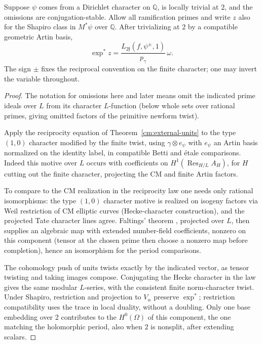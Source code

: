 \begin{lemma}\label{cm:period-transfer}
Suppose \(\psi\) comes from a Dirichlet character on \(\mathbb Q\),
is locally trivial at \(2\), and the omissions are conjugation-stable.
Allow all ramification primes and write \(z\) also for the Shapiro
class in \(M^*\psi\) over \(\mathbb Q\).
After trivializing at \(2\) by a compatible geometric Artin basis,
\[
 \exp^*z=\frac{L_{2\mathfrak f}(f,\psi^\pm,1)}{p_\gamma}\,\omega .
 \tag{C3}\label{eq:C3}
\]
The sign \(\pm\) fixes the reciprocal convention on the finite
character; one may invert the variable throughout.
\end{lemma}

\begin{proof}
The notation for omissions here and later means omit the indicated prime ideals over \(L\)
from its character \(L\)-function (below whole sets over rational primes, giving omitted
factors of the primitive newform twist).

Apply the reciprocity equation of Theorem~\ref{cm:external-units} to the type \((1,0)\)
character modified by the finite twist, using \(\gamma\otimes e_\psi\) with \(e_\psi\) an
Artin basis normalized on the identity label, in compatible Betti and étale comparisons.
Indeed this motive over \(L\) occurs with coefficients on \(H^1(\operatorname{Res}_{H/L}
A_H)\), for \(H\) cutting out the finite character, projecting the CM and finite Artin
factors.

To compare to the CM realization in the reciprocity law one needs only rational isomorphisms:
the type \((1,0)\) character motive is realized on isogeny factors via Weil restriction of CM
elliptic curves (Hecke-character construction), and the projected Tate character lines agree.
Faltings' theorem \cite{Faltings83}, projected over \(L\), then supplies an algebraic map with
extended number-field coefficients, nonzero on this component (tensor at the chosen prime then
choose a nonzero map before completion), hence an isomorphism for the period comparisons.

The cohomology push of units twists exactly by the indicated vector, as tensor twisting and
taking images compose. Conjugating the Hecke character in the law gives the same modular
\(L\)-series, with the consistent finite norm-character twist. Under Shapiro, restriction and
projection to \(V_\alpha\) preserve \(\exp^*\); restriction compatibility uses the trace in
local duality, without a doubling. Only one base embedding over 2 contributes to the
\(H^0(\Omega)\) of this component, the one matching the holomorphic period, also when \(2\) is
nonsplit, after extending scalars.


\end{proof}
